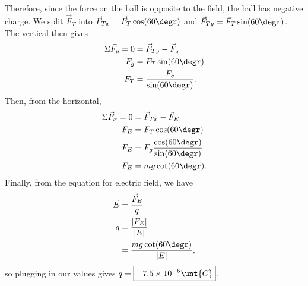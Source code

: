 \documentclass[11pt]{article}
\begin{document}
\begin{solution}
	\noindent Therefore, since the force on the ball is opposite to the field, the ball has negative charge. We split $\vec{F}_T$ into $\vec{F}_{Tx} = \vec{F}_T\cos(60\degr)$ and $\vec{F}_{Ty} = \vec{F}_T\sin(60\degr)$. The vertical then gives
	\begin{align*}
		\Sigma \vec{F}_y = 0 &= \vec{F}_{Ty} - \vec{F}_g \\
		F_g &= F_{T}\sin(60\degr) \\
		F_T &= \frac{F_g}{\sin(60\degr)}.
	\end{align*}
	Then, from the horizontal,
	\begin{align*}
		\Sigma \vec{F}_x = 0 &= \vec{F}_{Tx}	 - \vec{F}_E \\
		F_E &= F_T\cos(60\degr) \\
		F_E &= F_g\frac{\cos(60\degr)}{\sin(60\degr)} \\
		F_E &= mg\cot(60\degr).
	\end{align*}
	Finally, from the equation for electric field, we have
	\begin{align*}
		\vec{E} &= \frac{\vec{F}_E}{q} \\
		q &= \frac{|F_E|}{|E|} \\
		&= \frac{mg\cot(60\degr)}{|E|},
	\end{align*}
	so plugging in our values gives $q = \boxed{-7.5\times 10^{-6}\unt{C}}$.
\end{solution}
\end{document}
